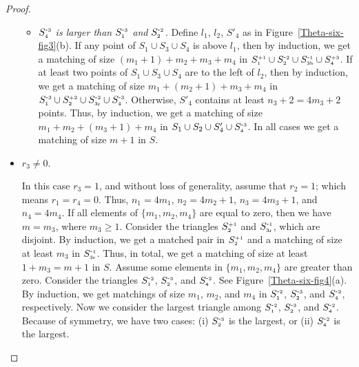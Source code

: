 \documentclass[11pt,a4paper]{article}
\newcommand{\SP}[2]{S^{\text{\tiny +#1}}_\text{\tiny #2}}
\newcommand{\SM}[2]{S^{\text{-\tiny #1}}_\text{\tiny #2}}
\begin{document}
\begin{proof}
\begin{itemize}
\begin{itemize}
\item {\em $\SM{3}{4}$ is larger than $\SM{3}{1}$ and $\SM{2}{2}$.}
Define $l_1$, $l_2$, $S'_4$ as in Figure~\ref{Theta-six-fig3}(b). If any point of $S_1\cup S_3\cup S_4$ is above $l_1$, then by induction, we get a matching of size $(m_1+1)+m_2+m_3+m_4$ in $\SP{1}{1}\cup \SM{2}{2}\cup\SM{1}{3b}\cup \SP{3}{4}$. If at least two points of $S_1\cup S_3\cup S_4$ are to the left of $l_2$, then by induction, we get a matching of size $m_1+(m_2+1)+m_3+m_4$ in $\SM{3}{1}\cup \SP{2}{2}\cup\SM{2}{3r}\cup \SM{3}{4}$. Otherwise, $S'_4$ contains at least $n_3+2=4m_3+2$ points. Thus, by induction, we get a matching of size $m_1+m_2+(m_3+1)+ m_4$ in $S_1\cup S_2\cup S'_4\cup \SM{3}{4}$. In all cases we get a matching of size $m+1$ in $S$.
\end{itemize}
  \item $r_3\neq 0.$

In this case $r_3=1$, and without loss of generality, assume that $r_2=1$; which means $r_1=r_4=0$. Thus, $n_1=4m_1$, $n_2=4m_2+1$, $n_3=4m_3+1$, and $n_4=4m_4$. If all elements of $\{m_1,m_2,m_4\}$ are equal to zero, then we have $m=m_3$, where $m_3\ge 1$. Consider the triangles $\SP{1}{2}$ and $\SM{1}{3r}$, which are disjoint. By induction, we get a matched pair in $\SP{1}{2}$ and a matching of size at least $m_3$ in $\SM{1}{3r}$. Thus, in total, we get a matching of size at least $1+m_3=m+1$ in $S$. Assume some elements in $\{m_1,m_2,m_4\}$ are greater than zero. Consider the triangles $\SM{2}{1}$, $\SM{3}{2}$, and $\SM{2}{4}$. See Figure~\ref{Theta-six-fig4}(a). By induction, we get matchings of size $m_1$, $m_2$, and $m_4$ in $\SM{2}{1}$, $\SM{3}{2}$, and $\SM{2}{4}$, respectively. 
Now we consider the largest triangle among $\SM{2}{1}$, $\SM{3}{2}$, and $\SM{2}{4}$. Because of symmetry, we have two cases: (i) $\SM{3}{2}$ is the largest, or (ii) $\SM{2}{4}$ is the largest.


\end{itemize}
\end{proof}
\end{document}
